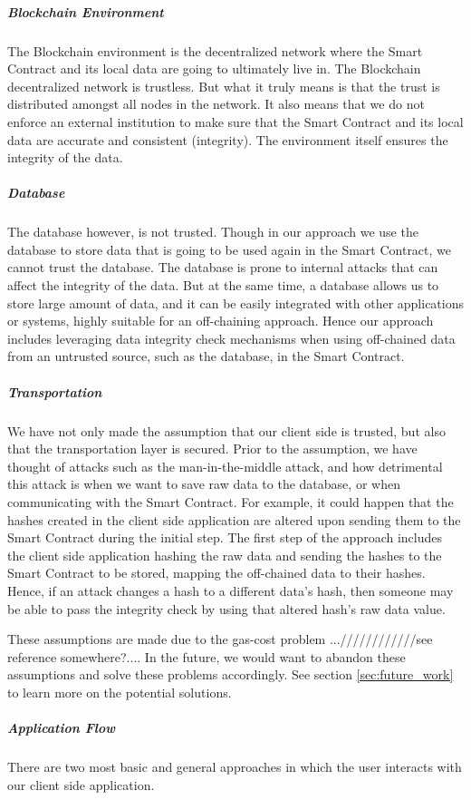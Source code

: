 \subparagraph{Blockchain Environment}
The Blockchain environment is the decentralized network where the Smart Contract and its local data are going to ultimately live in. The Blockchain decentralized network is trustless. But what it truly means is that the trust is distributed amongst all nodes in the network. It also means that we do not enforce an external institution to make sure that the Smart Contract and its local data are accurate and consistent (integrity). The environment itself ensures the integrity of the data.

\subparagraph{Database}
The database however, is not trusted. Though in our approach we use the database to store data that is going to be used again in the Smart Contract, we cannot trust the database. The database is prone to internal attacks that can affect the integrity of the data. But at the same time, a database allows us to store large amount of data, and it can be easily integrated with other applications or systems, highly suitable for an off-chaining approach. Hence our approach includes leveraging data integrity check mechanisms when using off-chained data from an untrusted source, such as the database, in the Smart Contract.

\subparagraph{Transportation}
We have not only made the assumption that our client side is trusted, but also that the transportation layer is secured. Prior to the assumption, we have thought of attacks such as the man-in-the-middle attack, and how detrimental this attack is when we want to save raw data to the database, or when communicating with the Smart Contract. For example, it could happen that the hashes created in the client side application are altered upon sending them to the Smart Contract during the initial step. The first step of the approach includes the client side application hashing the raw data and sending the hashes to the Smart Contract to be stored, mapping the off-chained data to their hashes. Hence, if an attack changes a hash to a different data’s hash, then someone may be able to pass the integrity check by using that altered hash’s raw data value.

These assumptions are made due to the gas-cost problem ...////////////see reference somewhere?.... In the future, we would want to abandon these assumptions and solve these problems accordingly. See section \ref{sec:future_work} to learn more on the potential solutions.

\subparagraph{Application Flow}
There are two most basic and general approaches in which the user interacts with our client side application. 

